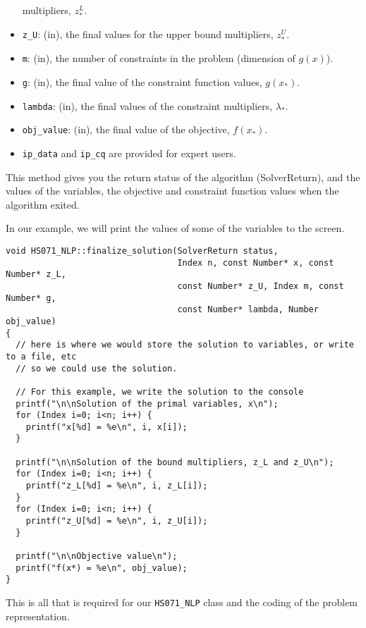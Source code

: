 \documentclass[10pt]{article}
\begin{document}
\begin{itemize}
  multipliers, $z^L_*$.
\item {\tt z\_U}: (in), the final values for the upper bound
  multipliers, $z^U_*$.
\item {\tt m}: (in), the number of constraints in the problem
  (dimension of $g(x)$).
\item {\tt g}: (in), the final value of the constraint function
  values, $g(x_*)$.
\item {\tt lambda}: (in), the final values of the constraint
  multipliers, $\lambda_*$.
\item {\tt obj\_value}: (in), the final value of the objective,
  $f(x_*)$.
\item {\tt ip\_data} and {\tt ip\_cq} are provided for expert users.
\end{itemize}

This method gives you the return status of the algorithm
(SolverReturn), and the values of the variables, 
the objective and constraint function values when the algorithm exited.

In our example, we will print the values of some of the variables to 
the screen.

\begin{footnotesize}
\begin{verbatim}
void HS071_NLP::finalize_solution(SolverReturn status,
                                  Index n, const Number* x, const Number* z_L,
                                  const Number* z_U, Index m, const Number* g,
                                  const Number* lambda, Number obj_value)
{
  // here is where we would store the solution to variables, or write to a file, etc
  // so we could use the solution. 

  // For this example, we write the solution to the console
  printf("\n\nSolution of the primal variables, x\n");
  for (Index i=0; i<n; i++) {
    printf("x[%d] = %e\n", i, x[i]); 
  }

  printf("\n\nSolution of the bound multipliers, z_L and z_U\n");
  for (Index i=0; i<n; i++) {
    printf("z_L[%d] = %e\n", i, z_L[i]); 
  }
  for (Index i=0; i<n; i++) {
    printf("z_U[%d] = %e\n", i, z_U[i]); 
  }

  printf("\n\nObjective value\n");
  printf("f(x*) = %e\n", obj_value); 
}
\end{verbatim}
\end{footnotesize}

This is all that is required for our {\tt HS071\_NLP} class and 
the coding of the problem representation.
 
\end{document}
